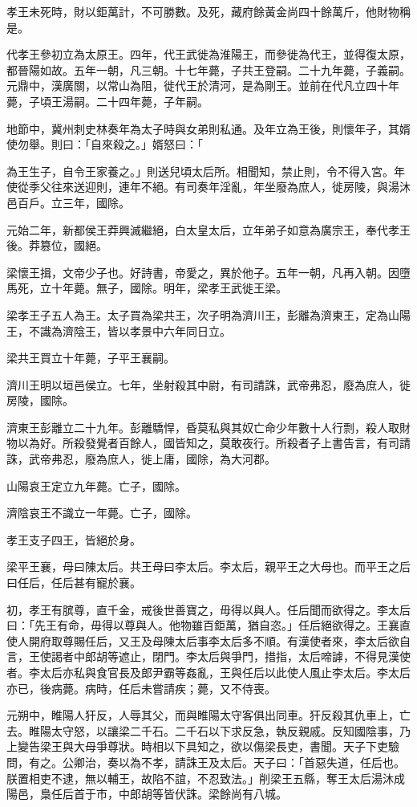 \begin{pinyinscope}
孝王未死時，財以鉅萬計，不可勝數。及死，藏府餘黃金尚四十餘萬斤，他財物稱是。

代孝王參初立為太原王。四年，代王武徙為淮陽王，而參徙為代王，並得復太原，都晉陽如故。五年一朝，凡三朝。十七年薨，子共王登嗣。二十九年薨，子義嗣。元鼎中，漢廣關，以常山為阻，徙代王於清河，是為剛王。並前在代凡立四十年薨，子頃王湯嗣。二十四年薨，子年嗣。

地節中，冀州刺史林奏年為太子時與女弟則私通。及年立為王後，則懷年子，其婿使勿舉。則曰：「自來殺之。」婿怒曰：「

為王生子，自令王家養之。」則送兒頃太后所。相聞知，禁止則，令不得入宮。年使從季父往來送迎則，連年不絕。有司奏年淫亂，年坐廢為庶人，徙房陵，與湯沐邑百戶。立三年，國除。

元始二年，新都侯王莽興滅繼絕，白太皇太后，立年弟子如意為廣宗王，奉代孝王後。莽篡位，國絕。

梁懷王揖，文帝少子也。好詩書，帝愛之，異於他子。五年一朝，凡再入朝。因墮馬死，立十年薨。無子，國除。明年，梁孝王武徙王梁。

梁孝王子五人為王。太子買為梁共王，次子明為濟川王，彭離為濟東王，定為山陽王，不識為濟陰王，皆以孝景中六年同日立。

梁共王買立十年薨，子平王襄嗣。

濟川王明以垣邑侯立。七年，坐射殺其中尉，有司請誅，武帝弗忍，廢為庶人，徙房陵，國除。

濟東王彭離立二十九年。彭離驕悍，昏莫私與其奴亡命少年數十人行剽，殺人取財物以為好。所殺發覺者百餘人，國皆知之，莫敢夜行。所殺者子上書告言，有司請誅，武帝弗忍，廢為庶人，徙上庸，國除，為大河郡。

山陽哀王定立九年薨。亡子，國除。

濟陰哀王不識立一年薨。亡子，國除。

孝王支子四王，皆絕於身。

梁平王襄，母曰陳太后。共王母曰李太后。李太后，親平王之大母也。而平王之后曰任后，任后甚有寵於襄。

初，孝王有膑尊，直千金，戒後世善寶之，毋得以與人。任后聞而欲得之。李太后曰：「先王有命，毋得以尊與人。他物雖百鉅萬，猶自恣。」任后絕欲得之。王襄直使人開府取尊賜任后，又王及母陳太后事李太后多不順。有漢使者來，李太后欲自言，王使謁者中郎胡等遮止，閉門。李太后與爭門，措指，太后啼謼，不得見漢使者。李太后亦私與食官長及郎尹霸等姦亂，王與任后以此使人風止李太后。李太后亦已，後病薨。病時，任后未嘗請疾；薨，又不侍喪。

元朔中，睢陽人犴反，人辱其父，而與睢陽太守客俱出同車。犴反殺其仇車上，亡去。睢陽太守怒，以讓梁二千石。二千石以下求反急，執反親戚。反知國陰事，乃上變告梁王與大母爭尊狀。時相以下具知之，欲以傷梁長吏，書聞。天子下吏驗問，有之。公卿治，奏以為不孝，請誅王及太后。天子曰：「首惡失道，任后也。朕置相吏不逮，無以輔王，故陷不誼，不忍致法。」削梁王五縣，奪王太后湯沐成陽邑，梟任后首于市，中郎胡等皆伏誅。梁餘尚有八城。


\end{pinyinscope}
